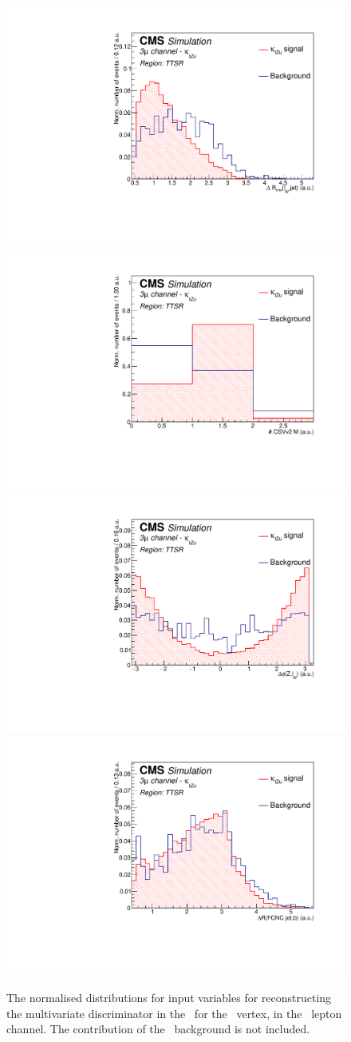 \begin{figure}[htbp]
	\includegraphics[width=0.3\linewidth]{6_Search/Figures/PlotsTechnics/deltaRWlepJet_minZuttoppairuuu_norm}
		\includegraphics[width=0.3\linewidth]{6_Search/Figures/PlotsTechnics/NJets_CSVv2MZuttoppairuuu_norm}
	\includegraphics[width=0.3\linewidth]{6_Search/Figures/PlotsTechnics/dPhiZWlepZuttoppairuuu_norm}
	\includegraphics[width=0.3\linewidth]{6_Search/Figures/PlotsTechnics/dRSMjetLightjetZuttoppairuuu_norm}
	\caption{The normalised distributions for input variables for reconstructing the multivariate discriminator in the \TTSR\ for the \Zut\ vertex, in the \mumumu\ lepton channel. The contribution of the \NPL\ background is not included.}
	\label{fig:toppairZutnormalized}
\end{figure}

